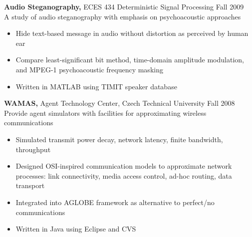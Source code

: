 \documentclass[margin]{res}
\begin{document}
\begin{resume}
\begin{telecom}
 {\bf Audio Steganography,} ECES 434 Deterministic Signal Processing \hfill Fall 2009 \\
A study of audio steganography with emphasis on psychoacoustic approaches
 \begin{itemize} \itemsep -2pt  %
 \item Hide text-based message in audio without distortion as perceived by human ear
 \item Compare least-significant bit method, time-domain amplitude modulation, and MPEG-1 psychoacoustic frequency masking 
 \item Written in MATLAB using TIMIT speaker database
 \end{itemize}
\end{telecom}

\begin{tech}
{\bf WAMAS,} Agent Technology Center, Czech Technical University \hfill Fall 2008 \\
Provide agent simulators with facilities for approximating wireless communications
\begin{itemize} \itemsep -2pt %
\item Simulated transmit power decay, network latency, finite bandwidth, throughput
\item Designed OSI-inspired communication models to approximate network processes: link connectivity, media access control, ad-hoc routing, data transport
\item Integrated into AGLOBE framework as alternative to perfect/no communications
\item Written in Java using Eclipse and CVS
\end{itemize}
\end{tech}


\end{resume}
\end{document}
